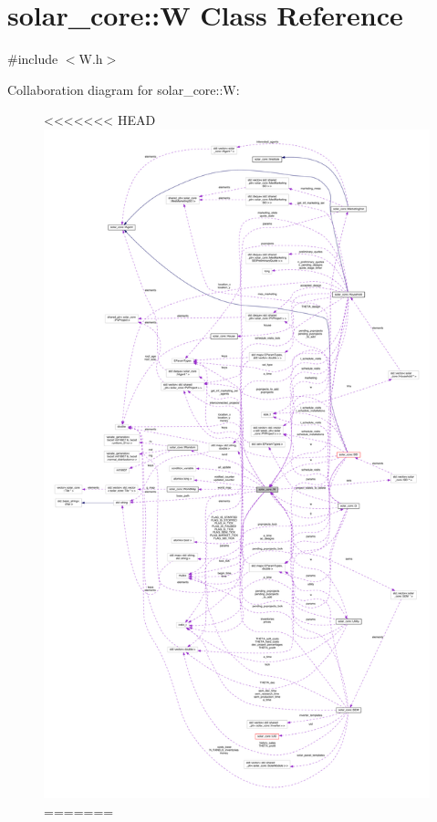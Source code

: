 \hypertarget{classsolar__core_1_1_w}{}\section{solar\+\_\+core\+:\+:W Class Reference}
\label{classsolar__core_1_1_w}


{\ttfamily \#include $<$W.\+h$>$}



Collaboration diagram for solar\+\_\+core\+:\+:W\+:
\nopagebreak
\begin{figure}[H]
\begin{center}
\leavevmode
<<<<<<< HEAD
\includegraphics[height=550pt]{classsolar__core_1_1_w__coll__graph}
=======

\end{center}
\end{figure}
